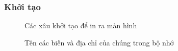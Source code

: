 \documentclass[a4paper,12pt]{article}
\begin{document}
\subsubsection{Khởi tạo}
\begin{figure}[!h]
	\centerline{}
	\caption{Các xâu khởi tạo để in ra màn hình}
	\label{fig:bai6}
\end{figure}
\clearpage
\begin{figure}[!h]
	\centerline{}
	\caption{Tên các biến và địa chỉ của chúng trong bộ nhớ}
	\label{fig:bai1}
\end{figure}
\end{document}
